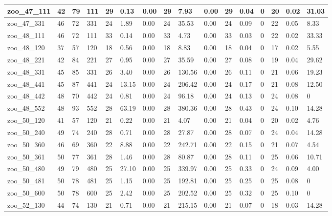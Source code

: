 \begin{landscape}
\begin{longtable}{llllllllllllllll}
zoo\_47\_111 & 42 & 79 & 111 & 29 & 0.13 & 0.00 & 29 & 7.93 & 0.00 & 29 & 0.04 & 0 & 20 & 0.02 & 31.03 \\ \hline 
zoo\_47\_331 & 46 & 72 & 331 & 24 & 1.89 & 0.00 & 24 & 35.53 & 0.00 & 24 & 0.09 & 0 & 22 & 0.05 & 8.33 \\ \hline 
zoo\_48\_111 & 46 & 72 & 111 & 33 & 0.14 & 0.00 & 33 & 4.73 & 0.00 & 33 & 0.03 & 0 & 22 & 0.02 & 33.33 \\ \hline 
zoo\_48\_120 & 37 & 57 & 120 & 18 & 0.56 & 0.00 & 18 & 8.83 & 0.00 & 18 & 0.04 & 0 & 17 & 0.02 & 5.55 \\ \hline 
zoo\_48\_221 & 42 & 84 & 221 & 27 & 0.95 & 0.00 & 27 & 35.59 & 0.00 & 27 & 0.08 & 0 & 19 & 0.04 & 29.62 \\ \hline 
zoo\_48\_331 & 45 & 85 & 331 & 26 & 3.40 & 0.00 & 26 & 130.56 & 0.00 & 26 & 0.11 & 0 & 21 & 0.06 & 19.23 \\ \hline 
zoo\_48\_441 & 45 & 87 & 441 & 24 & 13.15 & 0.00 & 24 & 206.42 & 0.00 & 24 & 0.17 & 0 & 21 & 0.08 & 12.50 \\ \hline 
zoo\_48\_442 & 48 & 70 & 442 & 24 & 0.81 & 0.00 & 24 & 96.18 & 0.00 & 24 & 0.13 & 0 & 24 & 0.08 & 0 \\ \hline 
zoo\_48\_552 & 48 & 93 & 552 & 28 & 63.19 & 0.00 & 28 & 380.36 & 0.00 & 28 & 0.43 & 0 & 24 & 0.10 & 14.28 \\ \hline 
zoo\_50\_120 & 41 & 57 & 120 & 21 & 0.22 & 0.00 & 21 & 4.07 & 0.00 & 21 & 0.04 & 0 & 20 & 0.02 & 4.76 \\ \hline 
zoo\_50\_240 & 49 & 74 & 240 & 28 & 0.71 & 0.00 & 28 & 27.87 & 0.00 & 28 & 0.07 & 0 & 24 & 0.04 & 14.28 \\ \hline 
zoo\_50\_360 & 46 & 69 & 360 & 22 & 8.88 & 0.00 & 22 & 242.71 & 0.00 & 22 & 0.15 & 0 & 21 & 0.07 & 4.54 \\ \hline 
zoo\_50\_361 & 50 & 77 & 361 & 28 & 1.46 & 0.00 & 28 & 80.87 & 0.00 & 28 & 0.11 & 0 & 25 & 0.06 & 10.71 \\ \hline 
zoo\_50\_480 & 49 & 79 & 480 & 25 & 27.10 & 0.00 & 25 & 339.97 & 0.00 & 25 & 0.33 & 0 & 24 & 0.09 & 4.00 \\ \hline 
zoo\_50\_481 & 50 & 78 & 481 & 25 & 1.15 & 0.00 & 25 & 192.81 & 0.00 & 25 & 0.25 & 0 & 25 & 0.08 & 0 \\ \hline 
zoo\_50\_600 & 50 & 78 & 600 & 25 & 2.42 & 0.00 & 25 & 202.52 & 0.00 & 25 & 0.32 & 0 & 25 & 0.10 & 0 \\ \hline 
zoo\_52\_130 & 44 & 74 & 130 & 21 & 0.71 & 0.00 & 21 & 215.15 & 0.00 & 21 & 0.07 & 0 & 18 & 0.03 & 14.28 \\ \hline 

\end{longtable}
\end{landscape}
